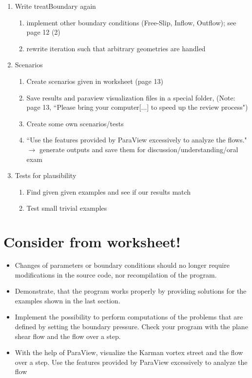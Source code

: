 \documentclass[a4paper]{article}
\newcommand{\qm}[1]{``#1"}							%
\newcommand{\ra}{\rightarrow}						%
\begin{document}
\begin{enumerate}
\item  Write treatBoundary again
\begin{enumerate}
\item implement other boundary conditions (Free-Slip, Inflow, Outflow); see page 12 (2)
\item rewrite iteration such that arbitrary geometries are handled
\end{enumerate}

\item Scenarios
\begin{enumerate}
\item Create scenarios given in worksheet (page 13) 
\item Save results and paraview visualization files in a special folder, (Note: page 13, \qm{Please bring your computer[...] to speed up the review process})
\item Create some own scenarios/tests
\item \qm{Use the features provided by ParaView excessively to analyze the flows.} $ \ra $ generate outputs and save them for discussion/understanding/oral exam 
\end{enumerate}

\item Tests for plausibility
\begin{enumerate}
\item Find given given examples and see if our results match
\item Test small trivial examples
\end{enumerate}

\end{enumerate} 


\section{Consider from worksheet!}

\begin{itemize}
\item Changes of parameters or boundary conditions should no longer require modifications in the source code, nor recompilation of the program.
\item Demonstrate, that the program works properly by providing solutions for the examples shown in the last section.
\item Implement the possibility to perform computations of the problems that are defined by setting the boundary pressure. Check your program with the plane shear flow and the flow over a step.
\item With the help of ParaView, visualize the Karman vortex street and the flow over a step. Use the features provided by ParaView excessively to analyze the flow
\end{itemize}
\end{document}
